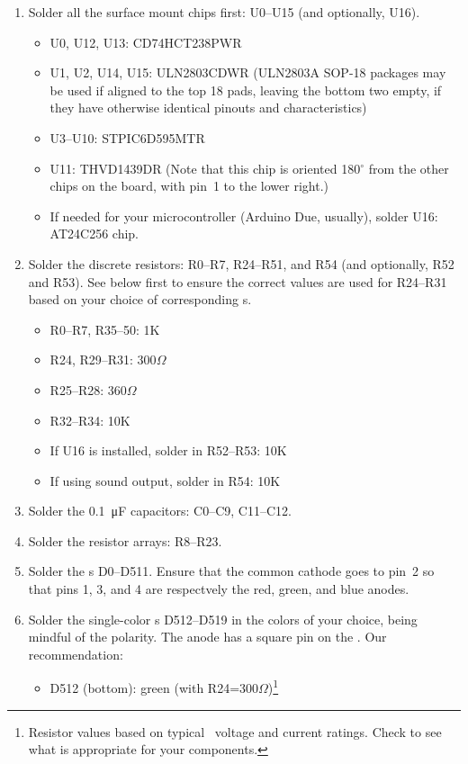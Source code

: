 \begin{enumerate}
	\item Solder all the surface mount chips first: U0--U15 (and optionally, U16).
		\begin{itemize}
			\item U0, U12, U13: CD74HCT238PWR
			\item U1, U2, U14, U15: ULN2803CDWR (ULN2803A SOP-18 packages may be used if aligned to the top 18 pads, leaving the bottom two empty, if they have otherwise identical pinouts and characteristics)
			\item U3--U10: STPIC6D595MTR
			\item U11: THVD1439DR (Note that this chip is oriented 180$^{\circ}$ from the other chips on the board, with pin~1 to the lower right.)
			\item If needed for your microcontroller (Arduino Due, usually), solder U16: AT24C256  chip.
		\end{itemize}
	\item Solder the discrete resistors: R0--R7, R24--R51, and R54 (and optionally, R52 and R53). See below first to ensure the correct values are used
		for R24--R31 based on your choice of corresponding \led s.
		\begin{itemize}
			\item R0--R7, R35--50: 1K
			\item R24, R29--R31: 300$\Omega$
			\item R25--R28: 360$\Omega$
			\item R32--R34: 10K
			\item If U16 is installed, solder in R52--R53: 10K
			\item If using sound output, solder in R54: 10K
		\end{itemize}
	\item Solder the \SI{0.1}{\micro\farad} capacitors: C0--C9, C11--C12.
	\item Solder the resistor arrays: R8--R23.
	\item Solder the  \led s D0--D511. Ensure that the common cathode goes to pin~2 so that pins 1, 3, and 4
		are respectvely the red, green, and blue anodes.
	\item Solder the single-color \led s D512--D519 in the colors of your choice, being mindful of the polarity. The anode has a square pin on the . Our recommendation:
		\begin{itemize}
			\item D512 (bottom): green (with R24=300$\Omega$)\footnote{Resistor values based on typical \led\ voltage and current ratings. Check to see what is appropriate for your components.}

\end{itemize}
\end{enumerate}
